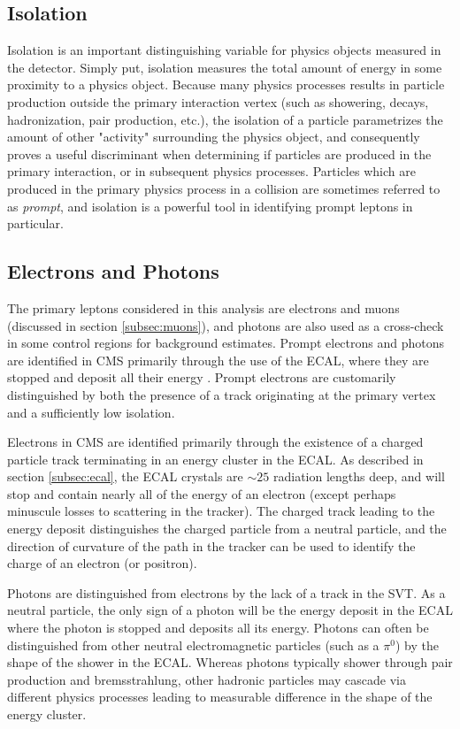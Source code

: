\subsection{Isolation}
\label{subsec:iso}
Isolation is an important distinguishing variable for physics objects measured in the detector. Simply put, isolation measures the total amount of energy in some proximity to a physics object. Because many physics processes results in particle production outside the primary interaction vertex (such as showering, decays, hadronization, pair production, etc.), the isolation of a particle parametrizes the amount of other "activity" surrounding the physics object, and consequently proves a useful discriminant when determining if particles are produced in the primary interaction, or in subsequent physics processes. Particles which are produced in the primary physics process in a collision are sometimes referred to as {\it prompt}, and isolation is a powerful tool in identifying prompt leptons in particular.

\subsection{Electrons and Photons}
\label{subsec:lepgamme}
The primary leptons considered in this analysis are electrons and muons (discussed in section \ref{subsec:muons}), and photons are also used as a cross-check in some control regions for background estimates. Prompt electrons and photons are identified in CMS primarily through the use of the ECAL, where they are stopped and deposit all their energy \cite{Baffioni:2006cd,Khachatryan:2015iwa}. Prompt electrons are customarily distinguished by both the presence of a track originating at the primary vertex and a sufficiently low isolation.

Electrons in CMS are identified primarily through the existence of a charged particle track terminating in an energy cluster in the ECAL. As described in section \ref{subsec:ecal}, the ECAL crystals are $\sim25$ radiation lengths deep, and will stop and contain nearly all of the energy of an electron (except perhaps minuscule losses to scattering in the tracker). The charged track leading to the energy deposit distinguishes the charged particle from a neutral particle, and the direction of curvature of the path in the tracker can be used to identify the charge of an electron (or positron).

Photons are distinguished from electrons by the lack of a track in the SVT. As a neutral particle, the only sign of a photon will be the energy deposit in the ECAL where the photon is stopped and deposits all its energy. Photons can often be distinguished from other neutral electromagnetic particles (such as a $\pi^0$) by the shape of the shower in the ECAL. Whereas photons typically shower through pair production and bremsstrahlung, other hadronic particles may cascade via different physics processes leading to measurable difference in the shape of the energy cluster.

